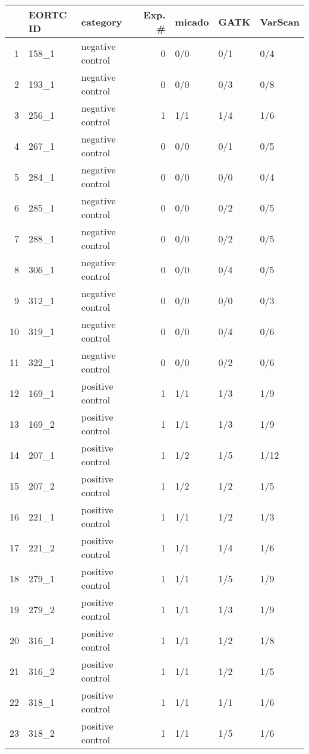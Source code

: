 \begin{table}[ht]
\centering
\begin{tabular}{rllrlll}
  \hline
 & EORTC ID & category & Exp. \# & micado & GATK & VarScan \\ 
  \hline
1 & 158\_1 & negative control &   0 & 0/0 & 0/1 & 0/4 \\ 
  2 & 193\_1 & negative control &   0 & 0/0 & 0/3 & 0/8 \\ 
  3 & 256\_1 & negative control &   1 & 1/1 & 1/4 & 1/6 \\ 
  4 & 267\_1 & negative control &   0 & 0/0 & 0/1 & 0/5 \\ 
  5 & 284\_1 & negative control &   0 & 0/0 & 0/0 & 0/4 \\ 
  6 & 285\_1 & negative control &   0 & 0/0 & 0/2 & 0/5 \\ 
  7 & 288\_1 & negative control &   0 & 0/0 & 0/2 & 0/5 \\ 
  8 & 306\_1 & negative control &   0 & 0/0 & 0/4 & 0/5 \\ 
  9 & 312\_1 & negative control &   0 & 0/0 & 0/0 & 0/3 \\ 
  10 & 319\_1 & negative control &   0 & 0/0 & 0/4 & 0/6 \\ 
  11 & 322\_1 & negative control &   0 & 0/0 & 0/2 & 0/6 \\ 
  12 & 169\_1 & positive control &   1 & 1/1 & 1/3 & 1/9 \\ 
  13 & 169\_2 & positive control &   1 & 1/1 & 1/3 & 1/9 \\ 
  14 & 207\_1 & positive control &   1 & 1/2 & 1/5 & 1/12 \\ 
  15 & 207\_2 & positive control &   1 & 1/2 & 1/2 & 1/5 \\ 
  16 & 221\_1 & positive control &   1 & 1/1 & 1/2 & 1/3 \\ 
  17 & 221\_2 & positive control &   1 & 1/1 & 1/4 & 1/6 \\ 
  18 & 279\_1 & positive control &   1 & 1/1 & 1/5 & 1/9 \\ 
  19 & 279\_2 & positive control &   1 & 1/1 & 1/3 & 1/9 \\ 
  20 & 316\_1 & positive control &   1 & 1/1 & 1/2 & 1/8 \\ 
  21 & 316\_2 & positive control &   1 & 1/1 & 1/2 & 1/5 \\ 
  22 & 318\_1 & positive control &   1 & 1/1 & 1/1 & 1/6 \\ 
  23 & 318\_2 & positive control &   1 & 1/1 & 1/5 & 1/6 \\ 

\end{tabular}
\end{table}
